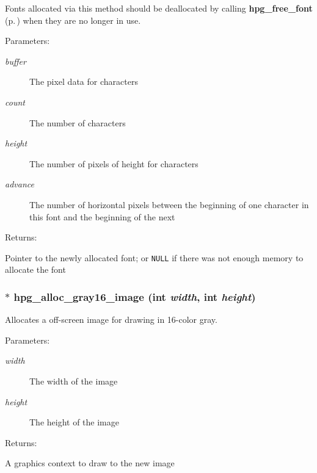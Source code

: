 Fonts allocated via this method should be deallocated by calling {\bf hpg\_\-free\_\-font} {\rm (p.\,\pageref{hpgraphics_8h_a73})} when they are no longer in use.\begin{Desc}
\item[Parameters: ]\par
\begin{description}
\item[{\em 
buffer}]The pixel data for characters \item[{\em 
count}]The number of characters \item[{\em 
height}]The number of pixels of height for characters \item[{\em 
advance}]The number of horizontal pixels between the beginning of one character in this font and the beginning of the next \end{description}
\end{Desc}
\begin{Desc}
\item[Returns: ]\par
Pointer to the newly allocated font; or {\tt NULL} if there was not enough memory to allocate the font \end{Desc}
\subsubsection{$\ast$ hpg\_\-alloc\_\-gray16\_\-image (int {\em width}, int {\em height})}\label{hpgraphics_8h_a77}


Allocates a off-screen image for drawing in 16-color gray.

\begin{Desc}
\item[Parameters: ]\par
\begin{description}
\item[{\em 
width}]The width of the image \item[{\em 
height}]The height of the image \end{description}
\end{Desc}
\begin{Desc}
\item[Returns: ]\par
A graphics context to draw to the new image \end{Desc}
